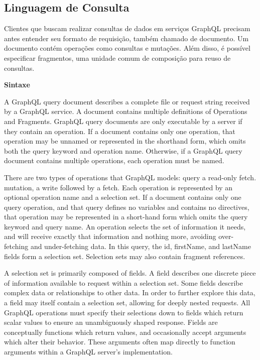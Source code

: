 \subsection[Linguagem de Consulta]{Linguagem de Consulta}

Clientes que buscam realizar consultas de dados em serviços GraphQL precisam antes entender seu formato de requisição, também chamado de documento. Um documento contém operações como consultas e mutações. Além disso, é possível especificar fragmentos, uma unidade comum de composição para reuso de consultas. \cite{GraphQL2016}

\textbf{Sintaxe}

A GraphQL query document describes a complete file or request string received by a GraphQL service. A document contains multiple definitions of Operations and Fragments. GraphQL query documents are only executable by a server if they contain an operation. If a document contains only one operation, that operation may be unnamed or represented in the shorthand form, which omits both the query keyword and operation name. Otherwise, if a GraphQL query document contains multiple operations, each operation must be named.

There are two types of operations that GraphQL models: query a read-only fetch. mutation, a write followed by a fetch. Each operation is represented by an optional operation name and a selection set. If a document contains only one query operation, and that query defines no variables and contains no directives, that operation may be represented in a short-hand form which omits the query keyword and query name. An operation selects the set of information it needs, and will receive exactly that information and nothing more, avoiding over-fetching and under-fetching data. In this query, the id, firstName, and lastName fields form a selection set. Selection sets may also contain fragment references.

A selection set is primarily composed of fields. A field describes one discrete piece of information available to request within a selection set. Some fields describe complex data or relationships to other data. In order to further explore this data, a field may itself contain a selection set, allowing for deeply nested requests. All GraphQL operations must specify their selections down to fields which return scalar values to ensure an unambiguously shaped response. Fields are conceptually functions which return values, and occasionally accept arguments which alter their behavior. These arguments often map directly to function arguments within a GraphQL server’s implementation.

